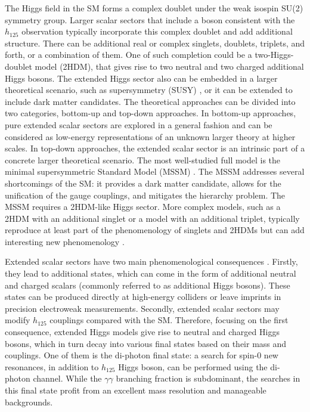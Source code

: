 \documentclass[a4paper, oneside, 11pt, openright]{book}
\begin{document}
		The Higgs field in the SM forms a complex doublet under the weak isospin SU(2) symmetry group. Larger scalar sectors that include a boson consistent with the $h_{125}$ observation typically incorporate this complex doublet and add additional structure. There can be additional real or complex singlets, doublets, triplets, and forth, or a combination of them. One of such completion could be a two-Higgs-doublet model (2HDM)\cite{Branco_2012}, that gives rise to two neutral and two charged additional Higgs bosons. The extended Higgs sector also can be embedded in a larger theoretical scenario, such as supersymmetry (SUSY) \cite{dine_2016}, or it can be extended to include dark matter candidates. The theoretical approaches can be divided into two categories, bottom-up and top-down approaches. In bottom-up approaches, pure extended scalar sectors are explored in a general fashion and can be considered as low-energy representations of an unknown larger theory at higher scales. In top-down approaches, the extended scalar sector is an intrinsic part of a concrete larger theoretical scenario. The most well-studied full model is the minimal supersymmetric Standard Model (MSSM) \cite{Djouadi_2008}. The MSSM addresses several shortcomings of the SM: it provides a dark matter candidate, allows for the unification of the gauge couplings, and mitigates the hierarchy problem. The MSSM requires a 2HDM-like Higgs sector. More complex models, such as a 2HDM with an additional singlet or a model with an additional triplet, typically reproduce at least part of the phenomenology of singlets and 2HDMs but can add interesting new phenomenology \cite{Dawson_2019}\cite{PhysRevD.98.030001}.
		
		
		
		Extended scalar sectors have two main phenomenological consequences \cite{ext_higgs}\cite{Englert_2014}. Firstly, they lead to additional states, which can come in the form of additional neutral and charged scalars (commonly referred to as additional Higgs bosons). These states can be produced directly at high-energy colliders or leave imprints in precision electroweak measurements. Secondly, extended scalar sectors may modify $h_{125}$ couplings compared with the SM. Therefore, focusing on the first consequence, extended Higgs models give rise to neutral and charged Higgs bosons, which in turn decay into various final states based on their mass and couplings. One of them is the di-photon final state: a search for spin-0 new resonances, in addition to $h_{125}$ Higgs boson, can be performed using the di-photon channel. While the $\gamma\gamma$ branching fraction is subdominant, the searches in this final state profit from an excellent mass resolution and manageable backgrounds. 
		
\end{document}
